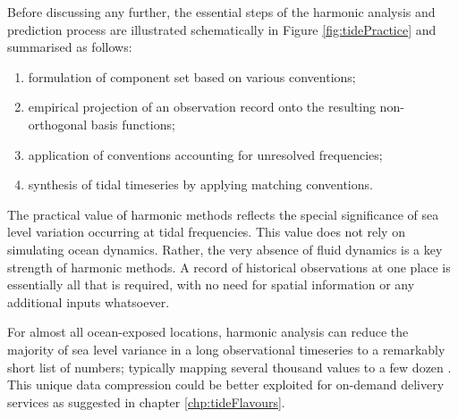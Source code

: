 Before discussing any further, the essential steps of the harmonic analysis and prediction process are  illustrated schematically in Figure \ref{fig:tidePractice} and summarised as follows:
\begin{enumerate}
    \item formulation of component set based on various conventions;
    \item empirical projection of an observation record onto the resulting non-orthogonal basis functions;
    \item application of conventions accounting for unresolved frequencies; 
    \item synthesis of tidal timeseries by applying matching conventions.
\end{enumerate}

The practical value of harmonic methods reflects the special significance of sea level variation occurring at tidal frequencies. This value does not rely on simulating ocean dynamics. Rather, the very absence of fluid dynamics is a key strength of harmonic methods. 
A record of historical observations at one place is essentially all that is required, with no need for spatial information or any additional inputs whatsoever.

For almost all ocean-exposed locations, harmonic analysis can reduce the majority of sea level variance in a long observational timeseries to a remarkably short list of numbers; typically mapping several thousand values to a few dozen \citep{Flinchem:2000kp}.  This unique data compression could be better exploited for on-demand delivery services as suggested in chapter \ref{chp:tideFlavours}. 


